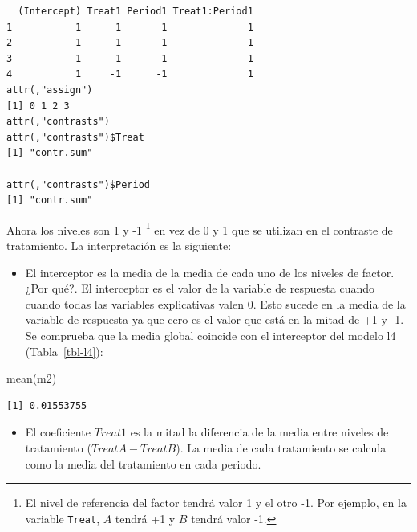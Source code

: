 \documentclass[
  12pt,
  a4paper,
  extrafontsizes,
  onecolumn,
  openright,
  table]{memoir}
\newenvironment{Shaded}{\begin{snugshade}}{\end{snugshade}}
\newcommand{\FunctionTok}[1]{\textcolor[rgb]{0.28,0.35,0.67}{#1}}
\newcommand{\NormalTok}[1]{\textcolor[rgb]{0.00,0.23,0.31}{#1}}
\providecommand{\tightlist}{%
  \setlength{\itemsep}{0pt}\setlength{\parskip}{0pt}}\usepackage{longtable,booktabs,array}
\begin{document}
\begin{verbatim}
  (Intercept) Treat1 Period1 Treat1:Period1
1           1      1       1              1
2           1     -1       1             -1
3           1      1      -1             -1
4           1     -1      -1              1
attr(,"assign")
[1] 0 1 2 3
attr(,"contrasts")
attr(,"contrasts")$Treat
[1] "contr.sum"

attr(,"contrasts")$Period
[1] "contr.sum"
\end{verbatim}

\normalsize

Ahora los niveles son 1 y -1 \footnote{El nivel de referencia del factor
  tendrá valor 1 y el otro -1. Por ejemplo, en la variable
  \texttt{Treat}, \(A\) tendrá +1 y \(B\) tendrá valor -1.} en vez de 0
y 1 que se utilizan en el contraste de tratamiento. La interpretación es
la siguiente:

\begin{itemize}
\tightlist
\item
  El interceptor es la media de la media de cada uno de los niveles de
  factor. ¿Por qué?. El interceptor es el valor de la variable de
  respuesta cuando cuando todas las variables explicativas valen 0. Esto
  sucede en la media de la variable de respuesta ya que cero es el valor
  que está en la mitad de +1 y -1. Se comprueba que la media global
  coincide con el interceptor del modelo l4 (Tabla~\ref{tbl-l4}):
\end{itemize}

\scriptsize

\begin{Shaded}
\begin{Highlighting}[]
\FunctionTok{mean}\NormalTok{(m2)}
\end{Highlighting}
\end{Shaded}

\begin{verbatim}
[1] 0.01553755
\end{verbatim}

\normalsize

\begin{itemize}
\tightlist
\item
  El coeficiente \(Treat1\) es la mitad la diferencia de la media entre
  niveles de tratamiento (\(TreatA-TreatB\)). La media de cada
  tratamiento se calcula como la media del tratamiento en cada periodo.
\end{itemize}

\scriptsize
\end{document}
